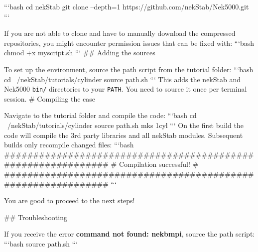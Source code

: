 \documentclass{article}
\begin{document}
\begin{markdown}
```bash
cd nekStab
git clone --depth=1 https://github.com/nekStab/Nek5000.git
```

If you are not able to clone and have to manually download the compressed repositories, you might encounter permission issues that can be fixed with:
```bash
chmod +x myscript.sh
```
## Adding the sources

To set up the environment, source the path script from the tutorial folder:
```bash
cd ~/nekStab/tutorials/cylinder
source path.sh
```
This adds the nekStab and Nek5000 \texttt{bin/} directories to your \texttt{PATH}. You need to source it once per terminal session.
\newpage
# Compiling the case

Navigate to the tutorial folder and compile the code:
```bash
cd ~/nekStab/tutorials/cylinder
source path.sh
mks 1cyl
```
On the first build the code will compile the 3rd party libraries and all nekStab modules. Subsequent builds only recompile changed files:
```bash
#############################################################
#                  Compilation successful!                  #
#############################################################
```

You are good to proceed to the next steps!

## Troubleshooting

If you receive the error \textbf{command not found: nekbmpi}, source the path script:
```bash
source path.sh
```

\end{markdown}




\newpage
\end{document}
